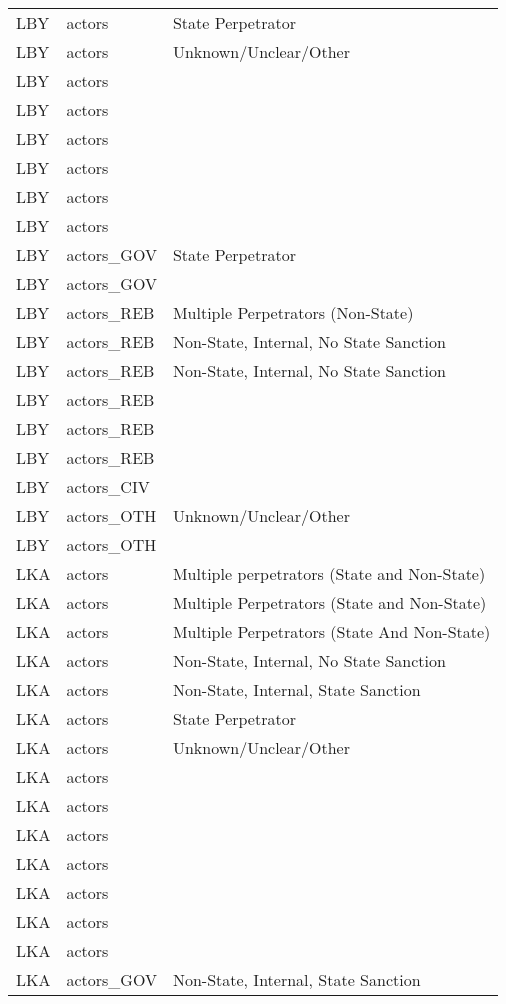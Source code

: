 \begin{table}[ht]
\begin{tabular}{lll}
  LBY & actors & State Perpetrator \\ 
  LBY & actors & Unknown/Unclear/Other \\ 
  LBY & actors &  \\ 
  LBY & actors &  \\ 
  LBY & actors &  \\ 
  LBY & actors &  \\ 
  LBY & actors &  \\ 
  LBY & actors &  \\ 
  LBY & actors\_GOV & State Perpetrator \\ 
  LBY & actors\_GOV &  \\ 
  LBY & actors\_REB & Multiple Perpetrators (Non-State) \\ 
  LBY & actors\_REB & Non-State, Internal, No State Sanction \\ 
  LBY & actors\_REB & Non-State, Internal, No State Sanction \\ 
  LBY & actors\_REB &  \\ 
  LBY & actors\_REB &  \\ 
  LBY & actors\_REB &  \\ 
  LBY & actors\_CIV &  \\ 
  LBY & actors\_OTH & Unknown/Unclear/Other \\ 
  LBY & actors\_OTH &  \\ 
  LKA & actors & Multiple perpetrators (State and Non-State) \\ 
  LKA & actors & Multiple Perpetrators (State and Non-State) \\ 
  LKA & actors & Multiple Perpetrators (State And Non-State) \\ 
  LKA & actors & Non-State, Internal, No State Sanction \\ 
  LKA & actors & Non-State, Internal, State Sanction \\ 
  LKA & actors & State Perpetrator \\ 
  LKA & actors & Unknown/Unclear/Other \\ 
  LKA & actors &  \\ 
  LKA & actors &  \\ 
  LKA & actors &  \\ 
  LKA & actors &  \\ 
  LKA & actors &  \\ 
  LKA & actors &  \\ 
  LKA & actors &  \\ 
  LKA & actors\_GOV & Non-State, Internal, State Sanction \\ 

\end{tabular}
\end{table}
